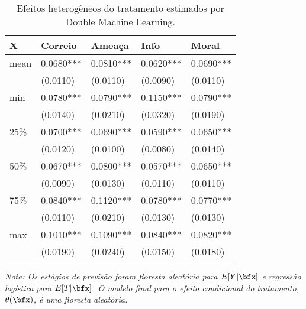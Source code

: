 \begin{table}[ht]
\centering
\caption{Efeitos heterogêneos do tratamento estimados por Double Machine Learning.}
\label{tab:dml-summary}
\begin{threeparttable}
\begin{tabular}{lllll}
\toprule
    X &    Correio &     Ameaça &       Info &      Moral \\
\midrule
 mean &  0.0680*** &  0.0810*** &  0.0620*** &  0.0690*** \\
  &   (0.0110) &   (0.0110) &   (0.0090) &   (0.0110) \\
  min &  0.0780*** &  0.0790*** &  0.1150*** &  0.0790*** \\
   &   (0.0140) &   (0.0210) &   (0.0320) &   (0.0190) \\
  25\% &  0.0700*** &  0.0690*** &  0.0590*** &  0.0650*** \\
   &   (0.0120) &   (0.0100) &   (0.0080) &   (0.0140) \\
  50\% &  0.0670*** &  0.0800*** &  0.0570*** &  0.0650*** \\
   &   (0.0090) &   (0.0130) &   (0.0110) &   (0.0110) \\
  75\% &  0.0840*** &  0.1120*** &  0.0780*** &  0.0770*** \\
   &   (0.0110) &   (0.0210) &   (0.0130) &   (0.0130) \\
  max &  0.1010*** &  0.1090*** &  0.0840*** &  0.0820*** \\
   &   (0.0190) &   (0.0240) &   (0.0150) &   (0.0180) \\
\bottomrule
\end{tabular}
\begin{tablenotes}
\item \emph{Nota: Os estágios de previsão foram floresta aleatória para $E[Y|\bfx]$ e regressão logística para $E[T|\bfx]$. O modelo final para o efeito condicional do tratamento, $\theta(\bfx)$, é uma floresta aleatória.}\\
\end{tablenotes}
\end{threeparttable}
\end{table}
